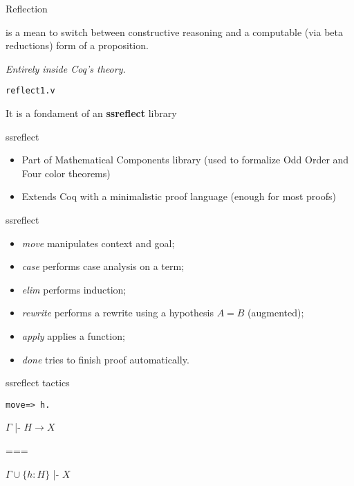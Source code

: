 \documentclass{beamer}
\begin{document}
\begin{frame}{Reflection}

    is a mean to switch between constructive reasoning and a computable 
    (via beta reductions) form of a proposition.
    
    \emph{Entirely inside Coq's theory.}

    \texttt{reflect1.v} 

    It is a fondament of an \textbf{ssreflect} library

\end{frame}

\begin{frame}{ssreflect}
    \begin{itemize}
    \item Part of Mathematical Components library (used to formalize Odd Order
        and Four color theorems)
    \item Extends Coq with a minimalistic proof language (enough for most proofs)
    \end{itemize}

\end{frame}

\begin{frame}{ssreflect}
    \begin{itemize}
    \item \emph{move} manipulates context and goal;
    \item \emph{case} performs case analysis on a term;
    \item \emph{elim} performs induction;
    \item \emph{rewrite} performs a rewrite using a hypothesis $A = B$ (augmented);
    \item \emph{apply} applies a function;
    \item \emph{done} tries to finish proof automatically.
    \end{itemize}

\end{frame}

\begin{frame}[fragile]{ssreflect tactics}

    \begin{lstlisting}
move=> h.
    \end{lstlisting}

    $\Gamma$ |-  $H \rightarrow X $
    
===

$\Gamma \cup \{ h: H \}$ |- $X$ 
\end{frame}
\end{document}
